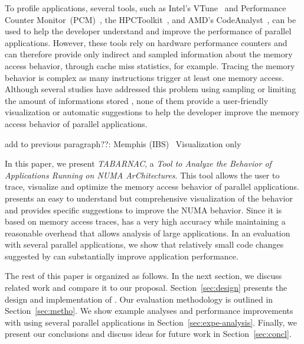 To profile applications, several tools, such as Intel's VTune~\cite{Reinders05VTune} and Performance Counter Monitor~(PCM)~\cite{Intel2012b}, the HPCToolkit~\cite{Adhianto10HPCTOOLKIT}, and AMD's CodeAnalyst~\cite{Drongowski2008}, can be used to help the
developer understand and improve the performance of parallel applications.
However, these tools rely on hardware performance counters and can therefore provide only indirect and sampled information about the memory access behavior, through cache miss statistics, for example.
Tracing the memory behavior is complex as many instructions trigger at least one memory access.
Although several studies have addressed this problem using sampling
\cite{Lachaize12MemProf} or limiting the amount of informations stored
, none of them provide a user-friendly visualization or automatic suggestions to help the developer improve the memory access behavior of parallel applications.

add to previous paragraph??:
Memphis (IBS)~\cite{McCurdy2010}
Visualization only~\cite{Weyers14Visualization}

In this paper, we present \emph{TABARNAC}, a \emph{Tool to Analyze the Behavior of
Applications Running on NUMA ArChitectures}. This tool allows the user to
trace, visualize and optimize the memory access behavior of parallel applications.
\TABARNAC presents an easy to understand but comprehensive visualization of the behavior and
provides specific suggestions to improve the NUMA behavior.
Since it is based on memory access traces, \TABARNAC has a very high accuracy while maintaining a reasonable overhead that allows analysis of large applications.
In an evaluation with several parallel applications, we show that relatively small code changes suggested by \TABARNAC can substantially improve application performance.

The rest of this paper is organized as follows.
In the next section, we discuss related work and compare it to our proposal.
Section~\ref{sec:design} presents the design and implementation of \TABARNAC.
Our evaluation methodology is outlined in Section~\ref{sec:metho}.
We show example analyses and performance improvements with \TABARNAC using several parallel applications in Section~\ref{sec:expe-analysis}.
Finally, we present our conclusions and discuss ideas for future work in Section~\ref{sec:concl}.
